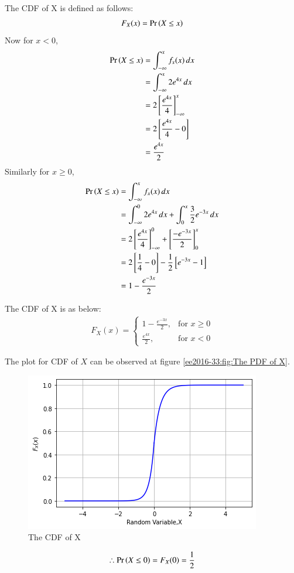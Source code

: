 The CDF of X is defined as follows:
\begin{align}
    F_X(x)= \Pr\left(X\leq x\right)
\end{align}
Now for $x<0$,
\begin{align}
\Pr\left(X\leq x\right) &= \int_{-\infty}^{x}{f_x(x)}\,dx\\
&= \int_{-\infty}^{x}{2e^{4x}}\,dx\\
&= 2\left[\frac{e^{4x}}{4}\right]_{-\infty}^{x}\\
&= 2\left[\frac{e^{4x}}{4}-0\right]\\
&= \frac{e^{4x}}{2}
\end{align}
Similarly for $x\geq0$,
\begin{align}
\Pr\left(X\leq x\right) &= \int_{-\infty}^{x}{f_x(x)}\,dx\\
&= \int_{-\infty}^{0}{2e^{4x}}\,dx +\int_{0}^{x}{\frac{3}{2}e^{-3x}}\,dx\\
&= 2\left[\frac{e^{4x}}{4}\right]_{-\infty}^{0}+\left[\frac{-e^{-3x}}{2}\right]_{0}^{x}\\
&= 2\left[\frac{1}{4}-0\right]-\frac{1}{2}\left[e^{-3x}-1\right]\\
&= 1-\frac{e^{-3x}}{2}
\end{align}

The CDF of X is as below:
\begin{align}
 F_X(x) = 
  \begin{cases}
  1-\frac{e^{-3x}}{2}, & \text{for } x \geq 0\\
  \frac{e^{4x}}{2}, & \text{for } x < 0
  \end{cases}
\end{align}

The plot for CDF of $X$ can be observed at figure \ref{ee2016-33:fig:The PDF of X}.
\begin{figure}[!ht]
       \centering
    \includegraphics[width=.9\columnwidth] {solutions/ee/2016/33/Assignment_2_Fig_1.png}
    \caption{The CDF of X}
    \label{ee2016-33:fig:The CDF of X}
\end{figure}

\begin{align}
\therefore
\Pr\left(X\leq0\right) = F_X(0)=\frac{1}{2}
\end{align}


